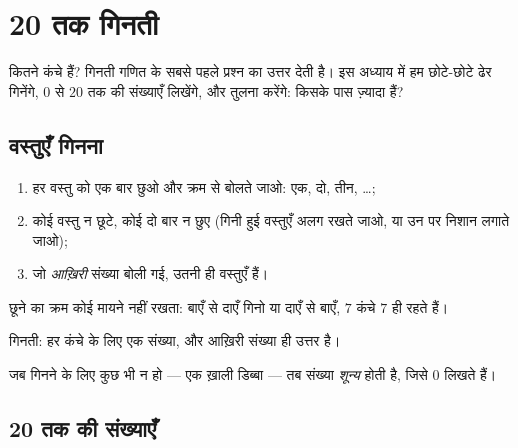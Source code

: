 \chapter{20 तक गिनती}\label{ch:g1:counting}

कितने कंचे हैं? गिनती गणित के सबसे पहले प्रश्न का उत्तर देती है। इस
अध्याय में हम छोटे-छोटे ढेर गिनेंगे, $0$ से $20$ तक की संख्याएँ
लिखेंगे, और तुलना करेंगे: किसके पास ज़्यादा हैं?

\section{वस्तुएँ गिनना}

\begin{method}[गिनने का तरीका]\label{met:g1:counting:how}
\begin{enumerate}
  \item हर वस्तु को एक बार छुओ और क्रम से बोलते जाओ: एक,
        दो, तीन, \dots;
  \item कोई वस्तु न छूटे, कोई दो बार न छुए (गिनी हुई वस्तुएँ
        अलग रखते जाओ, या उन पर निशान लगाते जाओ);
  \item जो \emph{आख़िरी} संख्या बोली गई, उतनी ही वस्तुएँ हैं।
\end{enumerate}
छूने का क्रम कोई मायने नहीं रखता: बाएँ से दाएँ गिनो या
दाएँ से बाएँ, $7$ कंचे $7$ ही रहते हैं।
\end{method}

\begin{omfigure}

{\small गिनती: हर कंचे के लिए एक संख्या, और आख़िरी संख्या ही
उत्तर है।}
\end{omfigure}

\begin{definition}[शून्य]\label{def:g1:counting:zero}
जब गिनने के लिए कुछ भी न हो --- एक ख़ाली डिब्बा --- तब संख्या
\emph{शून्य} होती है, जिसे $0$ लिखते हैं।
\end{definition}

\section{20 तक की संख्याएँ}

